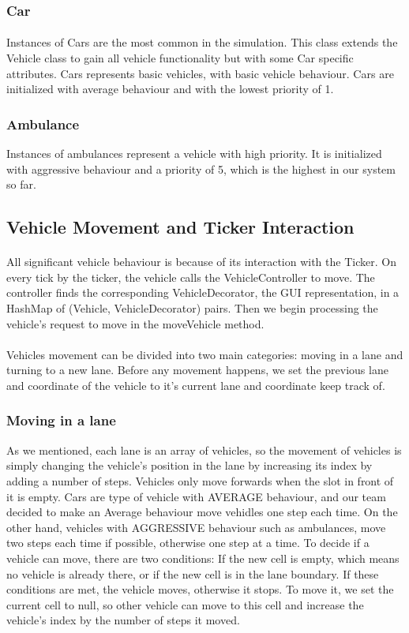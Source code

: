 \documentclass[a4paper,11pt,titlepage]{article}
\begin{document}
\subsubsection{Car}
\paragraph{}
Instances of Cars are the most common in the simulation. This class extends the Vehicle class to gain all vehicle functionality but with some Car specific attributes. Cars represents basic vehicles, with basic vehicle behaviour. Cars are initialized with average behaviour and with the lowest priority of 1.
\subsubsection{Ambulance}
Instances of ambulances represent a vehicle with high priority. It is initialized with aggressive behaviour and a priority of 5, which is the highest in our system so far.
\subsection{Vehicle Movement and Ticker Interaction}
\paragraph{}
All significant vehicle behaviour is because of its interaction with the Ticker. On every tick by the ticker, the vehicle calls the VehicleController to move. The controller finds the corresponding VehicleDecorator, the GUI representation, in a HashMap of (Vehicle, VehicleDecorator) pairs. Then we begin processing the vehicle's request to move in the moveVehicle method.
\paragraph{}
Vehicles movement can be divided into two main categories: moving in a lane and turning to a new lane. Before any movement happens, we set the previous lane and coordinate of the vehicle to it's current lane and coordinate keep track of.
\subsubsection{Moving in a lane}
As we mentioned, each lane is an array of vehicles, so the movement of vehicles is simply changing the vehicle's position in the lane by increasing its index by adding a number of steps. Vehicles only move forwards when the slot in front of it is empty. Cars are type of vehicle with AVERAGE behaviour, and our team decided to make an Average behaviour move vehidles one step each time. On the other hand, vehicles with AGGRESSIVE behaviour such as ambulances, move two steps each time if possible, otherwise one step at a time. To decide if a vehicle can move, there are two conditions: If the new cell is empty, which means no vehicle is already there, or if the new cell is in the lane boundary.
If these conditions are met, the vehicle moves, otherwise it stops.
To move it, we set the current cell to null, so other vehicle can move to this cell and increase the vehicle's index by the number of steps it moved.
\end{document}
